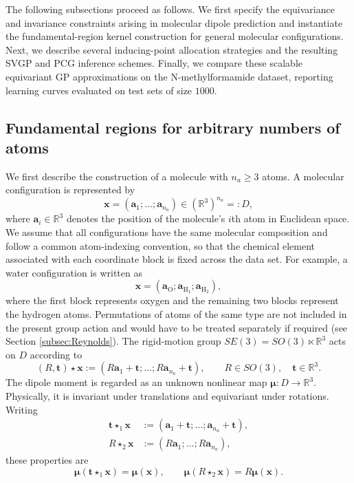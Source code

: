 \documentclass[11pt,a4paper]{article}
\newcommand{\bmu}{\boldsymbol{\mu}}
\newcommand{\bx}{\boldsymbol{x}}
\newcommand{\ba}{\boldsymbol{a}}
\begin{document}
The following subsections proceed as follows. We first specify the equivariance and invariance constraints arising in molecular dipole prediction and instantiate the fundamental-region kernel construction for general molecular configurations. Next, we describe several inducing-point allocation strategies and the resulting SVGP and PCG inference schemes. Finally, we compare these scalable equivariant GP approximations on the N-methylformamide dataset, reporting learning curves evaluated on test sets of size $1000$.
\newcommand{\bt}{\boldsymbol{t}}
\subsection{Fundamental regions for arbitrary numbers of atoms}
\label{subsubsec:fundamental-region-general}

We first describe the construction of a molecule with $n_a\geq 3$ atoms. A molecular configuration is represented by
\begin{equation*}
    \bx=(\ba_1;\ldots;\ba_{n_a})\in(\mathbb{R}^3)^{n_a}=:D,
\end{equation*}
where $\ba_i\in\mathbb{R}^3$ denotes the position of the molecule's $i$th atom in Euclidean space. We assume that all configurations have the same molecular composition and follow a common atom-indexing convention, so that the chemical element associated with each coordinate block is fixed across the data set. For example, a water configuration is written as
\begin{equation*}
    \bx=(\ba_{\mathrm O};\ba_{\mathrm H_1};\ba_{\mathrm H_2}),
\end{equation*}
where the first block represents oxygen and the remaining two blocks represent the hydrogen atoms. Permutations of atoms of the same type are not included in the present group action and would have to be treated separately if required (see Section \ref{subsec:Reynolds}). The rigid-motion group $SE(3)=SO(3)\ltimes\mathbb{R}^3$ acts on $D$ according to
\begin{equation}
    (R,\bt)\star\bx:=(R\ba_1+\bt;\ldots;R\ba_{n_a}+\bt),\qquad R\in SO(3),\quad \bt\in\mathbb{R}^3.
\end{equation}
The dipole moment is regarded as an unknown nonlinear map $\bmu:D\longrightarrow\mathbb{R}^3$. Physically, it is invariant under translations and equivariant under rotations. Writing
\begin{align}
    \bt\star_1\bx&:=(\ba_1+\bt;\ldots;\ba_{n_a}+\bt),\\
    R\star_2\bx&:=(R\ba_1;\ldots;R\ba_{n_a}),
\end{align}
these properties are
\begin{equation}
    \bmu(\bt\star_1\bx)=\bmu(\bx),\qquad \bmu(R\star_2\bx)=R\bmu(\bx).
\end{equation}
\end{document}
